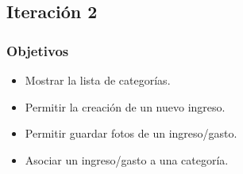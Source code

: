 \subsection{Iteración 2}

\subsubsection{Objetivos}
\begin{itemize}
\item Mostrar la lista de categorías.
\item Permitir la creación de un nuevo ingreso.
\item Permitir guardar fotos de un ingreso/gasto.
\item Asociar un ingreso/gasto a una categoría.
\end{itemize}

